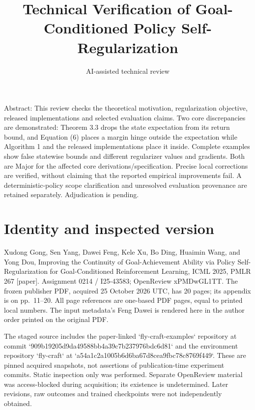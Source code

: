 \documentclass[10pt]{article}
\title{Technical Verification of Goal-Conditioned Policy Self-Regularization}
\author{AI-assisted technical review}
\date{}
\begin{document}
\maketitle
Abstract: This review checks the theoretical motivation, regularization objective, released implementations and selected evaluation claims. Two core discrepancies are demonstrated: Theorem 3.3 drops the state expectation from its return bound, and Equation (6) places a margin hinge outside the expectation while Algorithm 1 and the released implementations place it inside. Complete examples show false statewise bounds and different regularizer values and gradients. Both are Major for the affected core derivations/specification. Precise local corrections are verified, without claiming that the reported empirical improvements fail. A deterministic-policy scope clarification and unresolved evaluation provenance are retained separately. Adjudication is pending.\par
\section*{Identity and inspected version}
Xudong Gong, Sen Yang, Dawei Feng, Kele Xu, Bo Ding, Huaimin Wang, and Yong Dou, Improving the Continuity of Goal-Achievement Ability via Policy Self-Regularization for Goal-Conditioned Reinforcement Learning, ICML 2025, PMLR 267 [paper]. Assignment 0214 / I25-43583; OpenReview xPMDwGL1TT. The frozen publisher PDF, acquired 25 October 2026 UTC, has 20 pages; its appendix is on pp. 11–20. All page references are one-based PDF pages, equal to printed local numbers. The input metadata’s Feng Dawei is rendered here in the author order printed on the original PDF.\par
The staged source includes the paper-linked `fly-craft-examples` repository at commit `909b19205d9da49588bb4a39c7b237976bdc6d81` and the environment repository `fly-craft` at `a54a1c2a1005b6d6ba67d8cea9fbc78c8769f449`. These are pinned acquired snapshots, not assertions of publication-time experiment commits. Static inspection only was performed. Separate OpenReview material was access-blocked during acquisition; its existence is undetermined. Later revisions, raw outcomes and trained checkpoints were not independently obtained.\par
\end{document}
